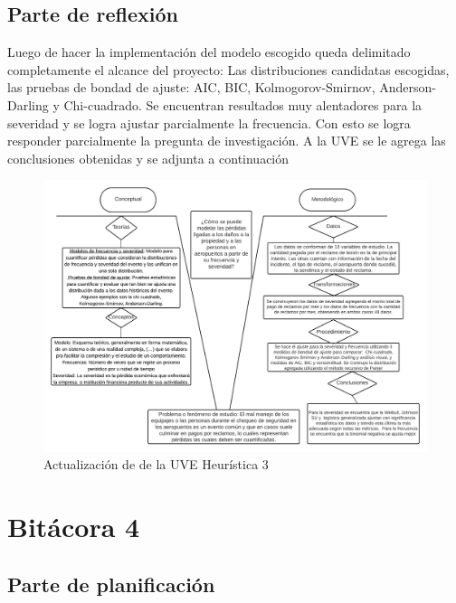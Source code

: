 \documentclass[
  letterpaper,
  onepage,
  openany]{scrreprt}
\begin{document}
\hypertarget{parte-de-reflexiuxf3n-1}{%
\section{Parte de reflexión}\label{parte-de-reflexiuxf3n-1}}

Luego de hacer la implementación del modelo escogido queda delimitado
completamente el alcance del proyecto: Las distribuciones candidatas
escogidas, las pruebas de bondad de ajuste: AIC, BIC,
Kolmogorov-Smirnov, Anderson-Darling y Chi-cuadrado. Se encuentran
resultados muy alentadores para la severidad y se logra ajustar
parcialmente la frecuencia. Con esto se logra responder parcialmente la
pregunta de investigación. A la UVE se le agrega las conclusiones
obtenidas y se adjunta a continuación

\begin{figure}[H]

\caption{\label{fig-UVE2}Actualización de de la UVE Heurística 3}

{\centering \includegraphics[width=6.25in,height=\textheight]{./Images/UVE Maik 3.png}

}

\end{figure}


\hypertarget{bituxe1cora-4}{%
\chapter{Bitácora 4}\label{bituxe1cora-4}}

\hypertarget{parte-de-planificaciuxf3n-2}{%
\section{Parte de planificación}\label{parte-de-planificaciuxf3n-2}}
\end{document}
